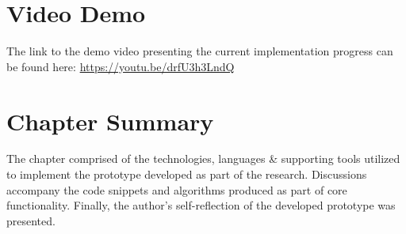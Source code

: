 

\section{Video Demo}
The link to the demo video presenting the current implementation progress can be found here: \url{https://youtu.be/drfU3h3LndQ}

\section{Chapter Summary}
The chapter comprised of the technologies, languages \& supporting tools utilized to implement the prototype developed as part of the research. Discussions accompany the code snippets and algorithms produced as part of core functionality. Finally, the author's self-reflection of the developed prototype was presented.
